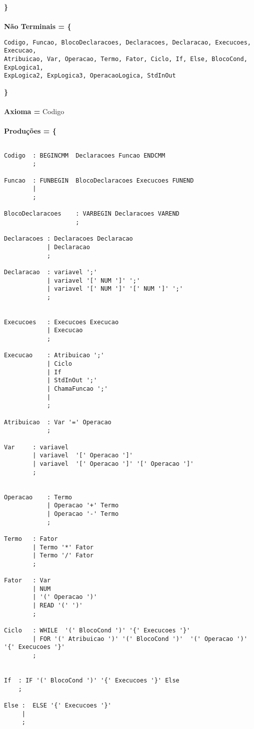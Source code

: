 \documentclass{report}
\begin{document}
\textbf{\}} \\\\
\textbf{Não Terminais = \{} 
\begin{verbatim}
Codigo, Funcao, BlocoDeclaracoes, Declaracoes, Declaracao, Execucoes, Execucao,
Atribuicao, Var, Operacao, Termo, Fator, Ciclo, If, Else, BlocoCond, ExpLogica1, 
ExpLogica2, ExpLogica3, OperacaoLogica, StdInOut
\end{verbatim}
\textbf{\}}\\\\
\textbf{Axioma = }Codigo \\\\
\newpage
\textbf{Produções = \{}
\begin{verbatim}

Codigo 	: BEGINCMM  Declaracoes Funcao ENDCMM
	   	;

Funcao 	: FUNBEGIN  BlocoDeclaracoes Execucoes FUNEND
	   	|
	   	;

BlocoDeclaracoes 	: VARBEGIN Declaracoes VAREND
					;

Declaracoes : Declaracoes Declaracao
			| Declaracao
			;

Declaracao 	: variavel ';'							
			| variavel '[' NUM ']' ';'				
			| variavel '[' NUM ']' '[' NUM ']' ';'	
			;


Execucoes 	: Execucoes Execucao
			| Execucao
			;

Execucao  	: Atribuicao ';'
		  	| Ciclo
		  	| If
		  	| StdInOut ';'
		  	| ChamaFuncao ';'
		  	|
		  	;

Atribuicao  : Var '=' Operacao
			;

Var 	: variavel 											
		| variavel 	'[' Operacao ']'						
		| variavel  '[' Operacao ']' '[' Operacao ']'		
		;


Operacao  	: Termo
		  	| Operacao '+' Termo				
		  	| Operacao '-' Termo				
		  	;

Termo 	: Fator
	  	| Termo '*' Fator						
	 	| Termo '/' Fator						
	 	;

Fator 	: Var 									
	  	| NUM									
	  	| '(' Operacao ')'
	  	| READ '(' ')'							
	  	;

Ciclo 	: WHILE  '(' BlocoCond ')' '{' Execucoes '}'
	  	| FOR '(' Atribuicao ')' '(' BlocoCond ')'  '(' Operacao ')' '{' Execucoes '}'
	  	;


If 	: IF '(' BlocoCond ')' '{' Execucoes '}' Else
   	;

Else :  ELSE '{' Execucoes '}'
	 |			  			  
	 ;




\end{verbatim}
\end{document}
